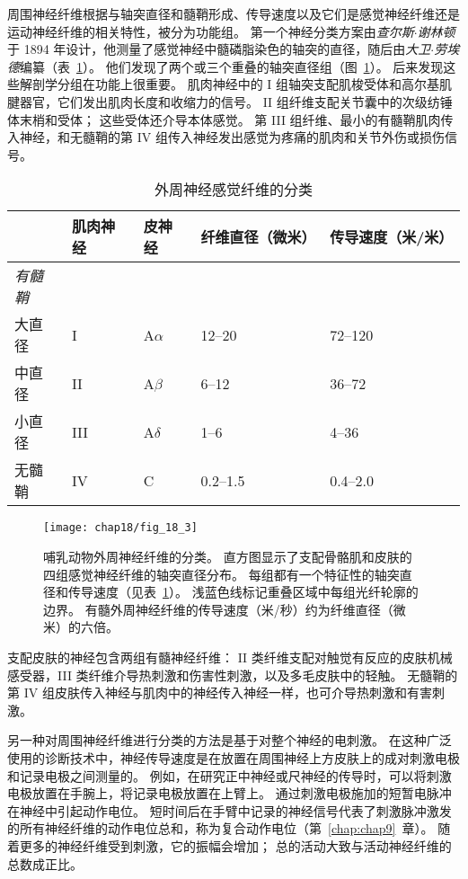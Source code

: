 周围神经纤维根据与轴突直径和髓鞘形成、传导速度以及它们是感觉神经纤维还是运动神经纤维的相关特性，被分为功能组。
第一个神经分类方案由\textit{查尔斯$\cdot$谢林顿}于 1894 年设计，他测量了感觉神经中髓磷脂染色的轴突的直径，随后由\textit{大卫$\cdot$劳埃德}编纂（表~\ref{tab:18_1}）。
他们发现了两个或三个重叠的轴突直径组（图~\ref{fig:18_3}）。
后来发现这些解剖学分组在功能上很重要。
肌肉神经中的 I 组轴突支配肌梭受体和高尔基肌腱器官，它们发出肌肉长度和收缩力的信号。
II 组纤维支配关节囊中的次级纺锤体末梢和受体；
这些受体还介导本体感觉。
第 III 组纤维、最小的有髓鞘肌肉传入神经，和无髓鞘的第 IV 组传入神经发出感觉为疼痛的肌肉和关节外伤或损伤信号。


\begin{table}[htbp]
	\caption{外周神经感觉纤维的分类} \label{tab:18_1} \centering
	\begin{tabular}{lllll}
		\toprule
		 & 肌肉神经 & 皮神经 & 纤维直径（微米） & 传导速度（米/米）\\
		\midrule
		\textit{有髓鞘} &  &  & &  \\
		大直径 & I  & A$\alpha$ & 12–20 & 72–120 \\
		中直径 & II  & A$\beta$ & 6–12 & 36–72 \\
		小直径 & III  & A$\delta$ & 1–6 & 4–36 \\
		无髓鞘 & IV  & C & 0.2–1.5 & 0.4–2.0 \\
		\bottomrule
	\end{tabular}
\end{table}



\begin{figure}[htbp]
	\centering
	\texttt{[image: chap18/fig\_18\_3]}
	\caption{哺乳动物外周神经纤维的分类。
	直方图显示了支配骨骼肌和皮肤的四组感觉神经纤维的轴突直径分布。
	每组都有一个特征性的轴突直径和传导速度（见表~\ref{tab:18_1}）。
	浅蓝色线标记重叠区域中每组光纤轮廓的边界。
	有髓外周神经纤维的传导速度（米/秒）约为纤维直径（微米）的六倍。}
	\label{fig:18_3}
\end{figure}



支配皮肤的神经包含两组有髓神经纤维：
II 类纤维支配对触觉有反应的皮肤机械感受器，III 类纤维介导热刺激和伤害性刺激，以及多毛皮肤中的轻触。
无髓鞘的第 IV 组皮肤传入神经与肌肉中的神经传入神经一样，也可介导热刺激和有害刺激。


另一种对周围神经纤维进行分类的方法是基于对整个神经的电刺激。
在这种广泛使用的诊断技术中，神经传导速度是在放置在周围神经上方皮肤上的成对刺激电极和记录电极之间测量的。
例如，在研究正中神经或尺神经的传导时，可以将刺激电极放置在手腕上，将记录电极放置在上臂上。
通过刺激电极施加的短暂电脉冲在神经中引起动作电位。
短时间后在手臂中记录的神经信号代表了刺激脉冲激发的所有神经纤维的动作电位总和，称为复合动作电位（第~\ref{chap:chap9}~章）。
随着更多的神经纤维受到刺激，它的振幅会增加；
总的活动大致与活动神经纤维的总数成正比。


